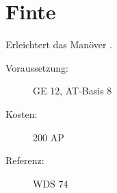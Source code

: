\section{Finte}
\label{sf.finte}
Erleichtert das Manöver .
\begin{description}
    \item[Voraussetzung:]
        GE 12, AT-Basis 8
    \item [Kosten:]
        200 AP
    \item [Referenz:]
        WDS 74
\end{description}
